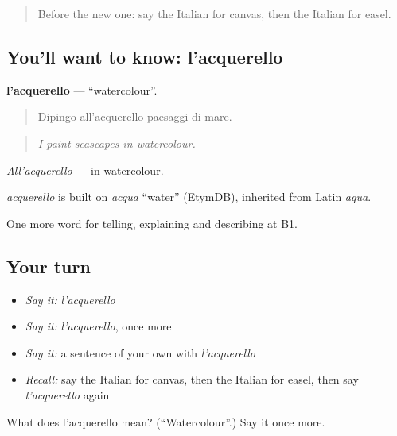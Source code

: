 \label{lesson:IT-C521-acquerello}



\begin{quote}
Before the new one: say the Italian for canvas, then the Italian for easel.
\end{quote}

\subsection*{You'll want to know: l'acquerello}
\textbf{l'acquerello} — \textquotedblleft{}watercolour\textquotedblright{}.

\begin{quote}
Dipingo all'acquerello paesaggi di mare.
\end{quote}

\begin{quote}
\emph{I paint seascapes in watercolour.}
\end{quote}

\emph{All'acquerello} — in watercolour.

\begin{cousinweb}
\emph{acquerello} is built on \emph{acqua} \textquotedblleft{}water\textquotedblright{} (EtymDB), inherited from Latin \emph{aqua}.
\end{cousinweb}

\begin{grammarlens}[title={What you've built}]
One more word for telling, explaining and describing at B1.
\end{grammarlens}

\subsection*{Your turn}
\begin{itemize}
\raggedright
  \item \emph{Say it:} \emph{l'acquerello}
  \item \emph{Say it:} \emph{l'acquerello}, once more
  \item \emph{Say it:} a sentence of your own with \emph{l'acquerello}
  \item \emph{Recall:} say the Italian for canvas, then the Italian for easel, then say \emph{l'acquerello} again
\end{itemize}

\begin{tcolorbox}[breakable,colback=teal!4,colframe=teal!35!black,title={Before you move on}]
What does l'acquerello mean? (\textquotedblleft{}Watercolour\textquotedblright{}.) Say it once more.
\end{tcolorbox}
